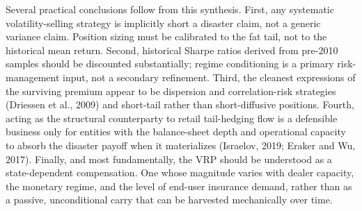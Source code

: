 \documentclass[11pt,a4paper]{article}
\begin{document}
Several practical conclusions follow from this synthesis. First, any systematic volatility-selling strategy is implicitly short a disaster claim, not a generic variance claim. Position sizing must be calibrated to the fat tail, not to the historical mean return. Second, historical Sharpe ratios derived from pre-2010 samples should be discounted substantially; regime conditioning is a primary risk-management input, not a secondary refinement. Third, the cleanest expressions of the surviving premium appear to be dispersion and correlation-risk strategies (Driessen et al., 2009) and short-tail rather than short-diffusive positions. Fourth, acting as the structural counterparty to retail tail-hedging flow is a defensible business only for entities with the balance-sheet depth and operational capacity to absorb the disaster payoff when it materializes (Israelov, 2019; Eraker and Wu, 2017). Finally, and most fundamentally, the VRP should be understood as a state-dependent compensation. One whose magnitude varies with dealer capacity, the monetary regime, and the level of end-user insurance demand, rather than as a passive, unconditional carry that can be harvested mechanically over time.

\clearpage
\end{document}
